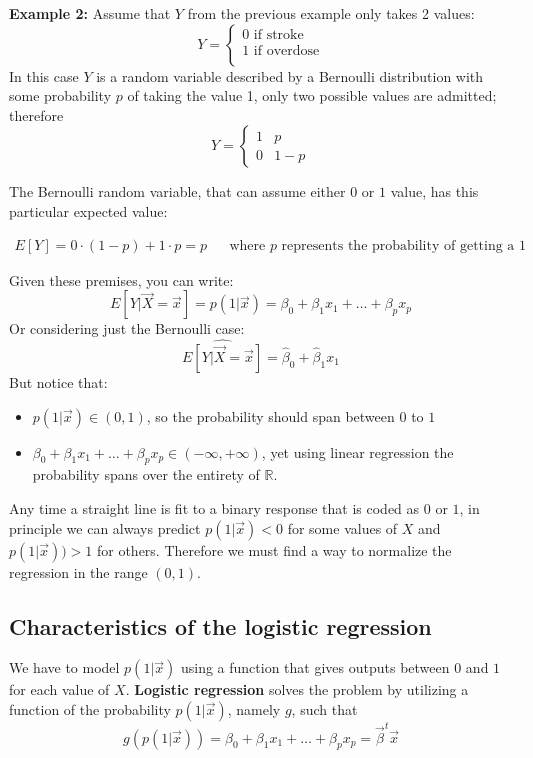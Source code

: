    \hfill

    \noindent\textbf{Example 2:} Assume that $Y$ from the previous example only
    takes 2 values:
    $$
    Y = \begin{cases}
          0 \text{ if stroke} \\
	        1 \text{ if overdose} \\
        \end{cases}
    $$
    In this case $Y$ is a random variable described by a Bernoulli distribution
    with some probability $p$ of taking the value 1, only two possible values
    are admitted; therefore 
    $$
    Y = \begin{cases}
          1 & p \\
	        0 & 1-p
        \end{cases}
    $$
    
    The Bernoulli random variable, that can assume either $0$ or $1$ value, has
    this particular expected value:
    
    \begin{align*}
      E[Y] = 0 \cdot (1-p) + 1 \cdot p = p && \text{where $p$ represents the probability of getting a $1$}
    \end{align*}
     
    Given these premises, you can write:
    $$E[Y|\vec{X} = \vec{x}] = p(1|\vec{x}) = \beta_0 + \beta_1 x_1 + \dots +
    \beta_px_p$$ Or considering just the Bernoulli case:
    $$\hat{E[Y|\vec{X} = \vec{x}]} = \hat{\beta}_0 + \hat{\beta}_1x_1$$ But
    notice that:
    \begin{itemize}
      \item $p(1|\vec{x}) \in (0, 1)$, so the probability should span between
      $0$ to $1$
      \item $\beta_0 + \beta_1 x_1 + \dots + \beta_px_p \in (-\infty, +\infty)$,
      yet using linear regression the probability spans over the entirety of
      $\mathbb{R}$.
    \end{itemize}
    
	Any time a straight line is fit to a binary response that is coded as $0$ or
    $1$, in principle we can always predict $p(1 | \vec{x}) < 0$ for some values
    of $X$ and $p(1 | \vec{x})) > 1$ for others. Therefore we must find a way to
    normalize the regression in the range $(0,1)$.
    
    \subsection{Characteristics of the logistic regression}
    We have to model $p(1 | \vec{x})$ using a function that gives outputs
    between $ 0 $ and $1$ for each value of $X$. \textbf{Logistic regression}
    solves the problem by utilizing a function of the probability
    $p(1|\vec{x})$, namely $g$, such that
    $$g(p(1|\vec{x})) = \beta_0 + \beta_1 x_1 + \dots + \beta_px_p =
    \vec{\beta}^t\vec{x}$$
    
